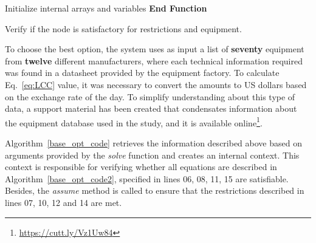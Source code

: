 \documentclass[review]{elsarticle}
\begin{document}
\begin{algorithm}[ht]
\SetAlgoLined
{}
 Initialize internal arrays and variables\;
\textbf{End Function}\;
\caption{Verify if the node is satisfactory for restrictions and equipment.}
\label{base_opt_code2}
\end{algorithm}

To choose the best option, the system uses as input a list of \textbf{seventy} equipment from \textbf{twelve} different manufacturers, where each technical information required was found in a datasheet provided by the equipment factory. To calculate Eq.~\ref{eq:LCC} value, it was necessary to convert the amounts to US dollars based on the exchange rate of the day. To simplify understanding about this type of data, a support material has been created that condensates information about the equipment database used in the study, and it is available online\footnote{\label{note1}\href{https://cutt.ly/Vz1Uw84}{https://cutt.ly/Vz1Uw84}}.


Algorithm~\ref{base_opt_code} retrieves the information described above based on arguments provided by the \textit{solve} function and creates an internal context. This context is responsible for verifying whether all equations are described in Algorithm~\ref{base_opt_code2}, specified in lines 06, 08, 11, 15 are satisfiable. Besides, the \textit{assume} method is called to ensure that the restrictions described in lines 07, 10, 12 and 14 are met.
\end{document}
